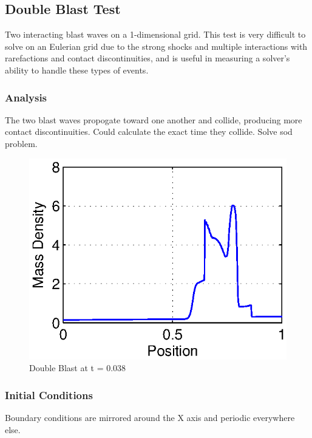 

\subsection{Double Blast Test}

Two interacting blast waves on a 1-dimensional grid. This test is very difficult to solve on an Eulerian grid due to the 
strong shocks and multiple interactions with rarefactions and contact discontinuities, and is useful in measuring a 
solver's ability to handle these types of events. 

\subsubsection{Analysis}

The two blast waves propogate toward one another and collide, producing more contact discontinuities.
Could calculate the exact time they collide. Solve sod problem.

\begin{figure}
\begin{center}
\includegraphics{DoubleBlast.eps}
\caption{Double Blast at t = 0.038}
\end{center}
\end{figure}
\subsubsection{Initial Conditions}

Boundary conditions are mirrored around the X axis and periodic everywhere else.

